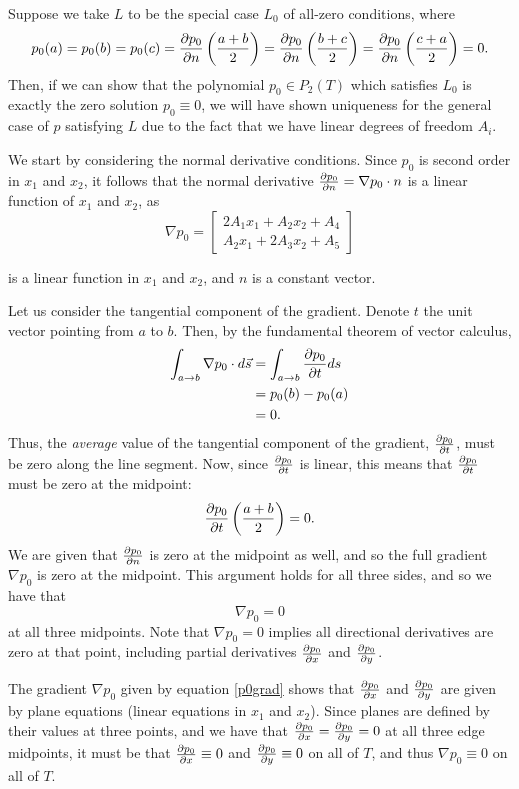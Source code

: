 \begin{problem}{1}
\begin{solution}
Suppose we take $L$ to be the special case $L_0$ of all-zero conditions, where
\begin{equation}\label{L0conds}
p_0(a) = p_0(b) = p_0(c) =
\frac{\partial p_0}{\partial n}\left(\frac{a+b}{2}\right) =
\frac{\partial p_0}{\partial n}\left(\frac{b+c}{2}\right) = 
\frac{\partial p_0}{\partial n}\left(\frac{c+a}{2}\right) = 0.
\end{equation}
Then, if we can show that the polynomial $p_0 \in P_2(T)$ which satisfies $L_0$ is exactly the zero solution $p_0 \equiv 0$, we will have shown uniqueness for the general case of $p$ satisfying $L$ due to the fact that we have linear degrees of freedom $A_i$.

We start by considering the normal derivative conditions.
Since $p_0$ is second order in $x_1$ and $x_2$, it follows that the normal derivative $\frac{\partial p_0}{\partial n} = \nabla{p_0} \cdot n$ is a linear function of $x_1$ and $x_2$, as
\begin{equation}\label{p0grad}
\nabla{p_0} = \begin{bmatrix}
2A_1 x_1 + A_2 x_2 + A_4 \\ 
A_2 x_1 + 2 A_3 x_2 + A_5
\end{bmatrix}
\end{equation}

is a linear function in $x_1$ and $x_2$, and $n$ is a constant vector.

Let us consider the tangential component of the gradient. Denote $t$ the unit vector pointing from $a$ to $b$. Then, by the fundamental theorem of vector calculus,
\begin{align*}
\int_{a\rightarrow b} \nabla{p_0} \cdot d\vec{s} &= \int_{a\rightarrow b} \frac{\partial p_0}{\partial t} ds \\
&= p_0(b) - p_0(a) \\ 
&= 0.
\end{align*}
Thus, the \textit{average} value of the tangential component of the gradient, $\frac{\partial p_0}{\partial t}$, must be zero along the line segment.
Now, since $\frac{\partial p_0}{\partial t}$ is linear, this means that $\frac{\partial p_0}{\partial t}$ must be zero at the midpoint:
$$ \frac{\partial p_0}{\partial t}\left(\frac{a+b}{2}\right) = 0.$$
We are given that $\frac{\partial p_0}{\partial n}$ is zero at the midpoint as well, and so the full gradient $\nabla{p_0}$ is zero at the midpoint.
This argument holds for all three sides, and so we have that 
$$\nabla{p_0} = 0$$
at all three midpoints.
Note that $\nabla{p_0} = 0$ implies all directional derivatives are zero at that point, including partial derivatives $\frac{\partial p_0}{\partial x}$ and $\frac{\partial p_0}{\partial y}$.

The gradient $\nabla{p_0}$ given by equation \ref{p0grad} shows that $\frac{\partial p_0}{\partial x}$ and $\frac{\partial p_0}{\partial y}$ are given by plane equations (linear equations in $x_1$ and $x_2$).
Since planes are defined by their values at three points, and we have that $\frac{\partial p_0}{\partial x} = \frac{\partial p_0}{\partial y} = 0$ at all three edge midpoints, it must be that $\frac{\partial p_0}{\partial x} \equiv 0$ and $\frac{\partial p_0}{\partial y} \equiv 0$ on all of $T$, and thus $\nabla{p_0} \equiv 0$ on all of $T$.


\end{solution}
\end{problem}

